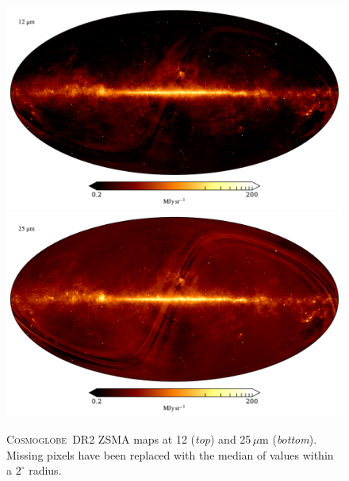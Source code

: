 \documentclass{aa}
\newcommand{\cosmoglobe}{\textsc{Cosmoglobe}}
\begin{document}
\begin{figure}
	\centering
	\includegraphics[width=0.96\linewidth]{figs/map_05.pdf}\\
	\includegraphics[width=0.96\linewidth]{figs/map_06.pdf}
	\caption{\cosmoglobe\ DR2 ZSMA maps at 12 (\emph{top}) and
          25$\,\mu$m (\emph{bottom}). Missing pixels have been replaced with
          the median of values within a $2^\circ$ radius.}
	\label{fig:freqmaps5_6}
\end{figure}
\end{document}
